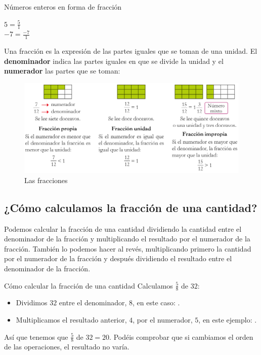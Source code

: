\begin{ejemplos}[label={Ejemplo:enteroComoFraccion}]{Números enteros en forma de fracción}
    \begin{multicols}{2}
        \begin{center}
            $\displaystyle 5 = \frac{5}{1}$ \\
            $\displaystyle -7 = \frac{-7}{1}$
        \end{center}
    \end{multicols}
\end{ejemplos}

Una fracción es la expresión de las partes iguales que se toman de una unidad. El \textbf{denominador} indica las partes iguales en que se divide la unidad y el \textbf{numerador} las partes que se toman:

\begin{figure}[!ht]
    \begin{center}
    \includegraphics[scale=0.5]{imagenes/01_Tema01/fracciones01.png}
    \caption{Las fracciones}
    \label{fig:fracciones01}
    \end{center}
\end{figure}

\subsection{¿Cómo calculamos la fracción de una cantidad?}

Podemos calcular la fracción de una cantidad dividiendo la cantidad entre el denominador de la fracción y multiplicando el resultado por el numerador de la fracción. También lo podemos hacer al revés, multiplicando primero la cantidad por el numerador de la fracción y después dividiendo el resultado entre el denominador de la fracción.

\begin{ejemplos}[label={Ejemplo:fraccionCantidad}]{Cómo calcular la fracción de una cantidad}
    Calculamos $\displaystyle \frac{5}{8}$ de $32$:

    \begin{itemize}
        \item Dividimos $32$ entre el denominador, $8$, en este caso: .
        \item Multiplicamos el resultado anterior, $4$, por el numerador, $5$, en este ejemplo: .
    \end{itemize}
    Así que tenemos que $\displaystyle \frac{5}{8}$ de $32 = 20$. Podéis comprobar que si cambiamos el orden de las operaciones, el resultado no varía.
\end{ejemplos}


